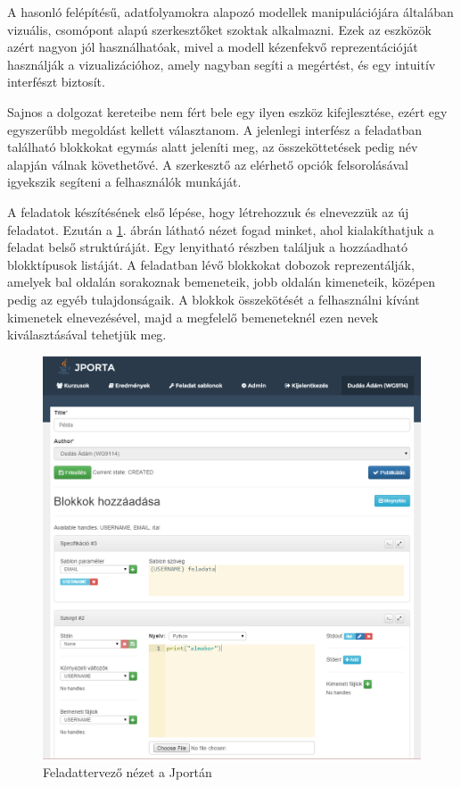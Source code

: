 A hasonló felépítésű, adatfolyamokra alapozó modellek manipulációjára általában vizuális, csomópont alapú szerkesztőket szoktak alkalmazni.
Ezek az eszközök azért nagyon jól használhatóak, mivel a modell kézenfekvő reprezentációját használják a vizualizációhoz, amely nagyban segíti a megértést, és egy intuitív interfészt biztosít.

Sajnos a dolgozat kereteibe nem fért bele egy ilyen eszköz kifejlesztése, ezért egy egyszerűbb megoldást kellett választanom.
A jelenlegi interfész a feladatban található blokkokat egymás alatt jeleníti meg, az összeköttetések pedig név alapján válnak követhetővé.
A szerkesztő az elérhető opciók felsorolásával igyekszik segíteni a felhasználók munkáját.

A feladatok készítésének első lépése, hogy létrehozzuk és elnevezzük az új feladatot.
Ezután a \ref{figure:jporta-exercise}. ábrán látható nézet fogad minket, ahol kialakíthatjuk a feladat belső struktúráját.
Egy lenyitható részben találjuk a hozzáadható blokktípusok listáját.
A feladatban lévő blokkokat dobozok reprezentálják, amelyek bal oldalán sorakoznak bemeneteik, jobb oldalán kimeneteik, középen pedig az egyéb tulajdonságaik.
A blokkok összekötését a felhasználni kívánt kimenetek elnevezésével, majd a megfelelő bemeneteknél ezen nevek kiválasztásával tehetjük meg.

\begin{figure}[h]
    \centering
    \includegraphics[width=\textwidth]{figures/jporta-exercise}
    \caption{Feladattervező nézet a Jportán}
    \label{figure:jporta-exercise}
\end{figure}

